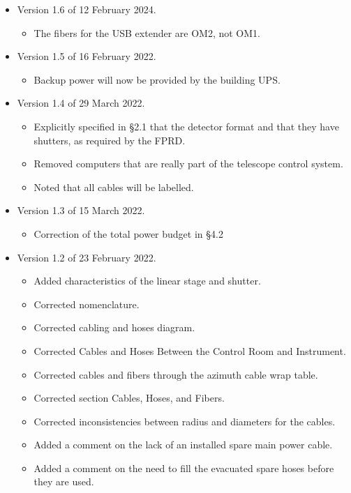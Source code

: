 \documentclass{article}
\begin{document}
\begin{itemize}

\item Version 1.6 of 12 February 2024.
\begin{itemize}
    \item The fibers for the USB extender are OM2, not OM1.
\end{itemize}

\item Version 1.5 of 16 February 2022.
\begin{itemize}
    \item Backup power will now be provided by the building UPS.
\end{itemize}


\item Version 1.4 of 29 March 2022.
\begin{itemize}
    \item Explicitly specified in \S2.1 that the detector format and that they have shutters, as required by the FPRD.
    \item Removed computers that are really part of the telescope control system.
    \item Noted that all cables will be labelled.
\end{itemize}

\item Version 1.3 of 15 March 2022.
\begin{itemize}
    \item Correction of the total power budget in \S4.2
\end{itemize}

\item Version 1.2 of 23 February 2022.
\begin{itemize}
    \item Added characteristics of the linear stage and shutter.
    \item Corrected nomenclature.
    \item Corrected cabling and hoses diagram.
    \item Corrected Cables and Hoses Between the Control Room and Instrument.
    \item Corrected cables and fibers through the azimuth cable wrap table.
    \item Corrected section Cables, Hoses, and Fibers.
    \item Corrected inconsistencies between radius and diameters for the cables.
    \item Added a comment on the lack of an installed spare main power cable.
    \item Added a comment on the need to fill the evacuated spare hoses before they are used.
\end{itemize}


\end{itemize}
\end{document}
